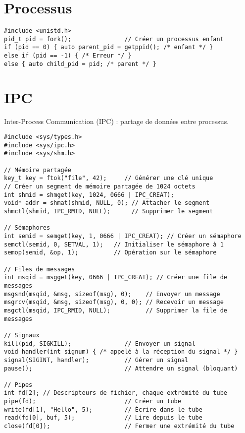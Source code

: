 \documentclass{article}
\begin{document}
\begin{multicols*}{3}
\section*{Processus}

\begin{lstlisting}
#include <unistd.h>
pid_t pid = fork();               // Créer un processus enfant
if (pid == 0) { auto parent_pid = getppid(); /* enfant */ }
else if (pid == -1) { /* Erreur */ }
else { auto child_pid = pid; /* parent */ }
\end{lstlisting}

\section*{IPC}
Inter-Process Communication (IPC) : partage de données entre processus.
\begin{lstlisting}
#include <sys/types.h>
#include <sys/ipc.h>
#include <sys/shm.h>

// Mémoire partagée
key_t key = ftok("file", 42);     // Générer une clé unique
// Créer un segment de mémoire partagée de 1024 octets
int shmid = shmget(key, 1024, 0666 | IPC_CREAT);
void* addr = shmat(shmid, NULL, 0); // Attacher le segment
shmctl(shmid, IPC_RMID, NULL);      // Supprimer le segment

// Sémaphores
int semid = semget(key, 1, 0666 | IPC_CREAT); // Créer un sémaphore
semctl(semid, 0, SETVAL, 1);   // Initialiser le sémaphore à 1
semop(semid, &op, 1);          // Opération sur le sémaphore

// Files de messages
int msqid = msgget(key, 0666 | IPC_CREAT); // Créer une file de messages
msgsnd(msqid, &msg, sizeof(msg), 0);    // Envoyer un message
msgrcv(msqid, &msg, sizeof(msg), 0, 0); // Recevoir un message
msgctl(msqid, IPC_RMID, NULL);          // Supprimer la file de messages

// Signaux
kill(pid, SIGKILL);               // Envoyer un signal
void handler(int signum) { /* appelé à la réception du signal */ }
signal(SIGINT, handler);          // Gérer un signal
pause();                          // Attendre un signal (bloquant)

// Pipes
int fd[2]; // Descripteurs de fichier, chaque extrémité du tube
pipe(fd);                         // Créer un tube
write(fd[1], "Hello", 5);         // Écrire dans le tube
read(fd[0], buf, 5);              // Lire depuis le tube
close(fd[0]);                     // Fermer une extrémité du tube
\end{lstlisting}


\end{multicols*}
\end{document}
